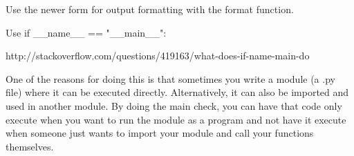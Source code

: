 \begin{guideline}
Use the newer form for output formatting with the format function.
\end{guideline}

\begin{guideline}
Use if __name__ == "__main__":

http://stackoverflow.com/questions/419163/what-does-if-name-main-do

One of the reasons for doing this is that sometimes you write a module (a .py file) where it can be executed directly. Alternatively, it can also be imported and used in another module. By doing the main check, you can have that code only execute when you want to run the module as a program and not have it execute when someone just wants to import your module and call your functions themselves.
\end{guideline}

